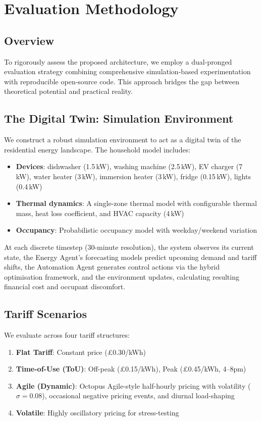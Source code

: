 \documentclass[11pt,a4paper]{article}
\begin{document}
\section{Evaluation Methodology}
\label{sec:evaluation}

\subsection{Overview}

To rigorously assess the proposed architecture, we employ a dual-pronged evaluation strategy combining comprehensive simulation-based experimentation with reproducible open-source code. This approach bridges the gap between theoretical potential and practical reality.

\subsection{The Digital Twin: Simulation Environment}

We construct a robust simulation environment to act as a digital twin of the residential energy landscape. The household model includes:
\begin{itemize}
    \item \textbf{Devices}: dishwasher (1.5\,kW), washing machine (2.5\,kW), EV charger (7\,kW), water heater (3\,kW), immersion heater (3\,kW), fridge (0.15\,kW), lights (0.4\,kW)
    \item \textbf{Thermal dynamics}: A single-zone thermal model with configurable thermal mass, heat loss coefficient, and HVAC capacity (4\,kW)
    \item \textbf{Occupancy}: Probabilistic occupancy model with weekday/weekend variation
\end{itemize}

At each discrete timestep (30-minute resolution), the system observes its current state, the Energy Agent's forecasting models predict upcoming demand and tariff shifts, the Automation Agent generates control actions via the hybrid optimisation framework, and the environment updates, calculating resulting financial cost and occupant discomfort.

\subsection{Tariff Scenarios}

We evaluate across four tariff structures:
\begin{enumerate}
    \item \textbf{Flat Tariff}: Constant price (\pounds0.30/kWh)
    \item \textbf{Time-of-Use (ToU)}: Off-peak (\pounds0.15/kWh), Peak (\pounds0.45/kWh, 4--8pm)
    \item \textbf{Agile (Dynamic)}: Octopus Agile-style half-hourly pricing with volatility ($\sigma = 0.08$), occasional negative pricing events, and diurnal load-shaping
    \item \textbf{Volatile}: Highly oscillatory pricing for stress-testing
\end{enumerate}
\end{document}

